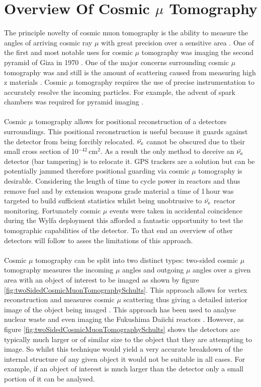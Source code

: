 \section{Overview Of Cosmic $\mu$ Tomography}\label{sec:cosMuOverview}
The principle novelty of cosmic muon tomography is the ability to measure the angles of arriving cosmic ray $\mu$ with great precision over a sensitive area \cite{Alvarez_Pyramids_1970}. One of the first and most notable uses for cosmic $\mu$ tomography was imaging the second pyramid of Giza in 1970 \cite{Alvarez_Pyramids_1970}. One of the major concerns surrounding cosmic $\mu$ tomography was and still is the amount of scattering caused from measuring high z materials \cite{Alvarez_Pyramids_1970}. Cosmic $\mu$ tomography requires the use of precise instrumentation to accurately resolve the incoming particles. For example, the advent of spark chambers was required for pyramid imaging \cite{Alvarez_Pyramids_1970}. 
\\\\Cosmic $\mu$ tomography allows for positional reconstruction of a detectors surroundings. This positional reconstruction is useful because it guards against the detector from being forcibly relocated. $\Bar{\nu_e}$ cannot be obscured due to their small cross section of 10$^{-42}$\,cm$^2$. As a result the only method to deceive an $\Bar{\nu_e}$ detector (bar tampering) is to relocate it. GPS trackers are a solution but can be potentially jammed therefore positional guarding via cosmic $\mu$ tomography is desirable. Considering the length of time to cycle power in reactors and thus remove fuel and by extension weapons grade material a time of 1\,hour was targeted to build sufficient statistics whilst being unobtrusive to $\Bar{\nu_e}$ reactor monitoring. Fortunately cosmic $\mu$ events were taken in accidental coincidence during the Wylfa deployment this afforded a fantastic opportunity to test the tomographic capabilities of the detector. To that end an overview of other detectors will follow to asses the limitations of this approach. 
\\\\Cosmic $\mu$ tomography can be split into two distinct types: two-sided cosmic $\mu$ tomography measures the incoming $\mu$ angles and outgoing $\mu$ angles over a given area with an object of interest to be imaged as shown by figure \ref{fig:twoSidedCosmicMuonTomographySchults}. This approach allows for vertex reconstruction and measures cosmic $\mu$ scattering thus giving a detailed interior image of the object being imaged \cite{schultz_2007}. This approach has been used to analyse nuclear waste \cite{jonkmans2013nuclear} and even imaging the Fukushima Daiichi reactors \cite{miyadera2013imaging}. However, as figure \ref{fig:twoSidedCosmicMuonTomographySchults} shows the  detectors are typically much larger or of similar size to the object that they are attempting to image. So whilst this technique would yield a very accurate breakdown of the internal structure of any given object it would not be suitable in all cases. For example, if an object of interest is much larger than the detector only a small portion of it can be analysed. 

